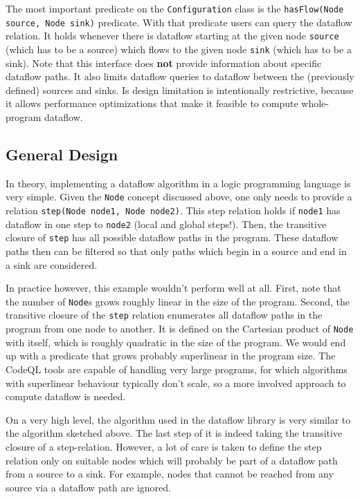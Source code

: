 The most important predicate on the \texttt{Configuration} class 
is the \texttt{hasFlow(Node source, Node sink)} predicate.
With that predicate users can query the dataflow relation.
It holds whenever there is dataflow starting at the given node \texttt{source} 
(which has to be a source) which flows to the given node \texttt{sink} (which has to be a sink).
Note that this interface does \textbf{not} provide information about specific
dataflow paths.
It also limits dataflow queries to dataflow between the (previously defined) sources and sinks.
Is design limitation is intentionally restrictive, because it allows performance optimizations
that make it feasible to compute whole-program dataflow.

\subsection{General Design}

In theory, implementing a dataflow algorithm in a logic programming language is very simple.
Given the \texttt{Node} concept discussed above, one only needs to provide a relation
\texttt{step(Node node1, Node node2)}.
This step relation holds if \texttt{node1} has dataflow in one step to \texttt{node2}
(local and global steps!).
Then, the transitive closure of \texttt{step} has all possible dataflow paths in the program.
These dataflow paths then can be filtered so that only paths which begin in a source and 
end in a sink are considered.

In practice however, this example wouldn't perform well at all.
First, note that the number of \texttt{Node}s grows roughly linear in the size of
the program.
Second, the transitive closure of the \texttt{step} relation enumerates all dataflow
paths in the program from one node to another.
It is defined on the Cartesian product of \texttt{Node} with itself, which is roughly quadratic 
in the size of the program.
We would end up with a predicate that grows probably superlinear in the program size.
The CodeQL tools are capable of handling very large programs,
for which algorithms with superlinear behaviour typically don't scale,
so a more involved approach to compute dataflow is needed.

On a very high level, the algorithm used in the dataflow library is very similar 
to the algorithm sketched above.
The last step of it is indeed taking the transitive closure of a step-relation.
However, a lot of care is taken to define the step relation only on suitable 
nodes which will probably be part of a dataflow path from a source to a sink.
For example, nodes that cannot be reached from any source via a dataflow path 
are ignored.

